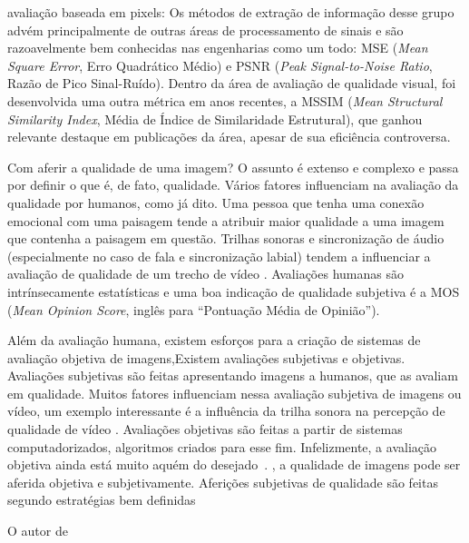 \begin{description}
	\item{avaliação baseada em pixels:}
		Os métodos de extração de informação desse grupo advém principalmente de outras áreas de processamento de sinais e são razoavelmente bem conhecidas nas engenharias como um todo: MSE (\emph{Mean Square Error}, Erro Quadrático Médio) e PSNR (\emph{Peak Signal-to-Noise Ratio}, Razão de Pico Sinal-Ruído). Dentro da área de avaliação de qualidade visual, foi desenvolvida uma outra métrica em anos recentes, a MSSIM (\emph{Mean Structural Similarity Index}, Média de Índice de Similaridade Estrutural), que ganhou relevante destaque em publicações da área, apesar de sua eficiência controversa.
\end{description}
Com aferir a qualidade de uma imagem? O assunto é extenso e complexo e passa por definir o que é, de fato, qualidade. Vários fatores influenciam na avaliação da qualidade por humanos, como já dito. Uma pessoa que tenha uma conexão emocional com uma paisagem tende a atribuir maior qualidade a uma imagem que contenha a paisagem em questão. Trilhas sonoras e sincronização de áudio (especialmente no caso de fala e sincronização labial) tendem a influenciar a avaliação de qualidade de um trecho de vídeo \cite{Winkler-2005-Wiley}. Avaliações humanas são intrínsecamente estatísticas e uma boa indicação de qualidade subjetiva é a MOS (\emph{Mean Opinion Score}, inglês para ``Pontuação Média de Opinião'').

Além da avaliação humana, existem esforços para a criação de sistemas de avaliação objetiva de imagens,Existem avaliações subjetivas e objetivas. Avaliações subjetivas são feitas apresentando imagens a humanos, que as avaliam em qualidade. Muitos fatores influenciam nessa avaliação subjetiva de imagens ou vídeo, um exemplo interessante é a influência da trilha sonora na percepção de qualidade de vídeo \cite{Winkler-2005-Wiley}. Avaliações objetivas são feitas a partir de sistemas computadorizados, algoritmos criados para esse fim. Infelizmente, a avaliação objetiva ainda está muito aquém do desejado~\cite{wang-bovik2006}. , a qualidade de imagens pode ser aferida objetiva e subjetivamente. Aferições subjetivas de qualidade são feitas segundo estratégias bem definidas

O autor de \cite{Winkler-2005-Wiley} 
